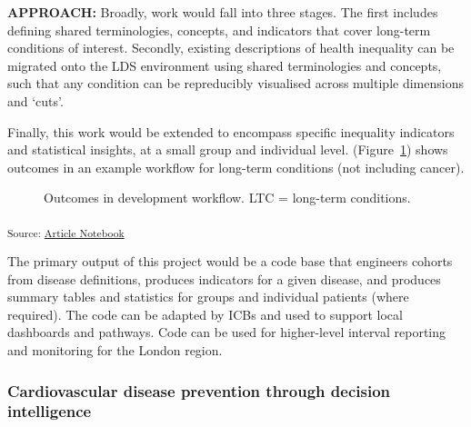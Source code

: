 \documentclass[
  letterpaper,
  DIV=11,
  numbers=noendperiod]{scrartcl}
\begin{document}
\textbf{APPROACH:} Broadly, work would fall into three stages. The first
includes defining shared terminologies, concepts, and indicators that
cover long-term conditions of interest. Secondly, existing descriptions
of health inequality can be migrated onto the LDS environment using
shared terminologies and concepts, such that any condition can be
repreducibly visualised across multiple dimensions and `cuts'.

Finally, this work would be extended to encompass specific inequality
indicators and statistical insights, at a small group and individual
level. (Figure~\ref{fig-rep-pipelines-inequality}) shows outcomes in an
example workflow for long-term conditions (not including cancer).

\begin{figure}


\caption{\label{fig-rep-pipelines-inequality}Outcomes in development
workflow. LTC = long-term conditions.}

\end{figure}%

\textsubscript{Source:
\href{https://d3london.github.io/sde_aic_docs/index.qmd.html}{Article
Notebook}}

The primary output of this project would be a code base that engineers
cohorts from disease definitions, produces indicators for a given
disease, and produces summary tables and statistics for groups and
individual patients (where required). The code can be adapted by ICBs
and used to support local dashboards and pathways. Code can be used for
higher-level interval reporting and monitoring for the London region.

\subsubsection{Cardiovascular disease prevention through decision
intelligence}\label{cardiovascular-disease-prevention-through-decision-intelligence}
\end{document}
